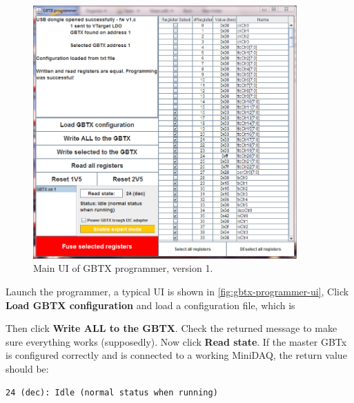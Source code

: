 \begin{figure}[!ht]
    \centering
    \includegraphics[width=0.9\textwidth]{res/gbtx_programmer_v1_ui.png}
    \caption{Main UI of GBTX programmer, version 1.}
    \label{fig:gbtx-programmer-ui}
\end{figure}

Launch the programmer, a typical UI is shown in
\autoref{fig:gbtx-programmer-ui},
Click \textbf{Load GBTX configuration} and load a configuration file, which is

Then click \textbf{Write ALL to the GBTX}. Check the returned message to make
sure everything works (supposedly).
Now click \textbf{Read state}.
If the master GBTx is configured correctly and is connected to a working
MiniDAQ, the return value should be:

\begin{lstlisting}
24 (dec): Idle (normal status when running)
\end{lstlisting}
